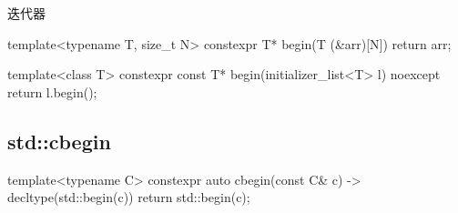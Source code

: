 \begin{content}
\begin{episode}{迭代器}
\begin{content}
\begin{c++}
template<typename T, size_t N>
constexpr T* begin(T (&arr)[N]) { 
  return arr; 
}

template<class T>
constexpr const T* begin(initializer_list<T> l) noexcept { 
  return l.begin(); 
}
\end{c++}

\subsection{std::cbegin}

\begin{c++}
template<typename C>
constexpr auto
cbegin(const C& c) -> decltype(std::begin(c)) { 
  return std::begin(c);
}
\end{c++}

\end{content}
\end{episode}

\end{content}


